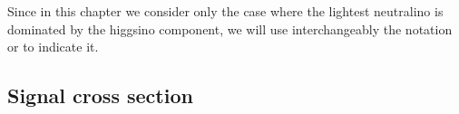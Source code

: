 Since in this chapter we consider only the case where the lightest neutralino is dominated by the higgsino component,
we will use interchangeably the notation \ninoone or \hino to indicate it.  



\subsection{Signal cross section}


